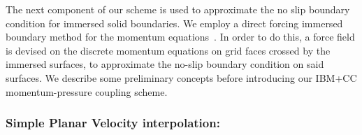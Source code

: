 \documentclass[12pt]{article}
\begin{document}
%
The next component of our scheme is used to approximate the no slip boundary condition for immersed solid boundaries. We employ a direct forcing immersed boundary method for the momentum equations~\cite{Fadlun:2000}. In order to do this, a force field is devised on the discrete momentum equations on grid faces crossed by the immersed surfaces, to approximate the no-slip boundary condition on said surfaces. We describe some preliminary concepts before introducing our IBM+CC momentum-pressure coupling scheme.

\subsubsection{Simple Planar Velocity interpolation:}
\end{document}
